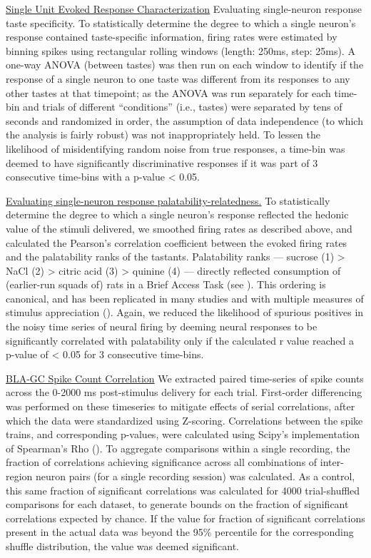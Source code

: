 \begin{refsection}
\noindent\underline{Single Unit Evoked Response Characterization}
Evaluating single-neuron response taste specificity. To statistically determine the degree to which a single neuron’s response contained taste-specific information, firing rates were estimated by binning spikes using rectangular rolling windows (length: 250ms, step: 25ms). A one-way ANOVA (between tastes) was then run on each window to identify if the response of a single neuron to one taste was different from its responses to any other tastes at that timepoint; as the ANOVA was run separately for each time-bin and trials of different “conditions” (i.e., tastes) were separated by tens of seconds and randomized in order, the assumption of data independence (to which the analysis is fairly robust) was not inappropriately held. To lessen the likelihood of misidentifying random noise from true responses, a time-bin was deemed to have significantly discriminative responses if it was part of 3 consecutive time-bins with a p-value < 0.05.

\noindent\underline{Evaluating single-neuron response palatability-relatedness.} To statistically determine the degree to which a single neuron’s response reflected the hedonic value of the stimuli delivered, we smoothed firing rates as described above, and calculated the Pearson’s correlation coefficient between the evoked firing rates and the palatability ranks of the tastants. Palatability ranks — sucrose (1) > NaCl (2) > citric acid (3) > quinine (4) — directly reflected consumption of (earlier-run squads of) rats in a Brief Access Task (see \cite{sadacca2012a}). This ordering is canonical, and has been replicated in many studies and with multiple measures of stimulus appreciation (\cite{travers1986a,clarke1998a,fontanini2006a}). Again, we reduced the likelihood of spurious positives in the noisy time series of neural firing by deeming neural responses to be significantly correlated with palatability only if the calculated r value reached a p-value of < 0.05 for 3 consecutive time-bins.

\noindent\underline{BLA-GC Spike Count Correlation}
We extracted paired time-series of spike counts across the 0-2000 ms post-stimulus delivery for each trial. First-order differencing was performed on these timeseries to mitigate effects of serial correlations, after which the data were standardized using Z-scoring. Correlations between the spike trains, and corresponding p-values, were calculated using Scipy’s implementation of Spearman’s Rho (\cite{p2020a}). To aggregate comparisons within a single recording, the fraction of correlations achieving significance across all combinations of inter-region neuron pairs (for a single recording session) was calculated. As a control, this same fraction of significant correlations was calculated for 4000 trial-shuffled comparisons for each dataset, to generate bounds on the fraction of significant correlations expected by chance. If the value for fraction of significant correlations present in the actual data was beyond the 95\% percentile for the corresponding shuffle distribution, the value was deemed significant. 


\end{refsection}
